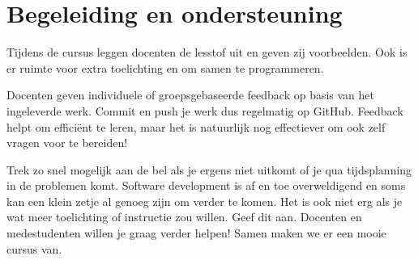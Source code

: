 \documentclass[dutch,a4paper,12pt,doubleside]{book}
\begin{document}
\section*{Begeleiding en ondersteuning}
Tijdens de cursus leggen docenten de lesstof uit en geven zij voorbeelden.
Ook is er ruimte voor extra toelichting en om samen te programmeren.

Docenten geven individuele of groepsgebaseerde feedback
op basis van het ingeleverde werk. Commit en push je werk dus regelmatig
op GitHub. Feedback helpt om efficiënt te leren, 
maar het is natuurlijk nog effectiever om ook zelf vragen voor te bereiden! 

Trek zo snel mogelijk aan de bel als je ergens niet uitkomt of 
je qua tijdsplanning in de problemen komt.
Software development is af en toe overweldigend en soms kan een 
klein zetje al genoeg zijn om verder te komen. Het is ook niet erg
als je wat meer toelichting of instructie zou willen. Geef dit aan.
Docenten en medestudenten willen je graag verder helpen!
Samen maken we er een mooie cursus van.
\end{document}
